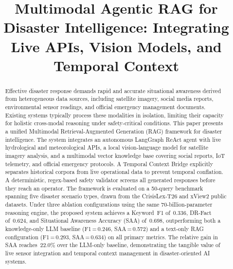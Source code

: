 \documentclass[conference]{IEEEtran}
\begin{document}
\title{Multimodal Agentic RAG for Disaster Intelligence: Integrating Live APIs,
Vision Models, and Temporal Context}

\author{
}

\maketitle

\begin{abstract}
Effective disaster response demands rapid and accurate situational awareness
derived from heterogeneous data sources, including satellite imagery, social
media reports, environmental sensor readings, and official emergency management
documents. Existing systems typically process these modalities in isolation,
limiting their capacity for holistic cross-modal reasoning under safety-critical
conditions. This paper presents a unified Multimodal Retrieval-Augmented
Generation (RAG) framework for disaster intelligence. The system integrates an
autonomous LangGraph ReAct agent with live hydrological and meteorological APIs,
a local vision-language model for satellite imagery analysis, and a multimodal
vector knowledge base covering social reports, IoT telemetry, and official
emergency protocols. A Temporal Context Bridge explicitly separates historical
corpora from live operational data to prevent temporal conflation. A
deterministic, regex-based safety validator screens all generated responses
before they reach an operator. The framework is evaluated on a 50-query
benchmark spanning five disaster scenario types, drawn from the CrisisLex-T26
and xView2 public datasets. Under three ablation configurations using the same
70-billion-parameter reasoning engine, the proposed system achieves a
Keyword~F1 of~0.336, DR-Fact of~0.624, and Situational Awareness Accuracy
(SAA) of~0.698, outperforming both a knowledge-only LLM baseline
(F1\,=\,0.246, SAA\,=\,0.572) and a text-only RAG configuration
(F1\,=\,0.293, SAA\,=\,0.634) on all primary metrics.
The relative gain in SAA reaches~22.0\% over the LLM-only baseline,
demonstrating the tangible value of live sensor integration and temporal
context management in disaster-oriented AI systems.
\end{abstract}
\end{document}
